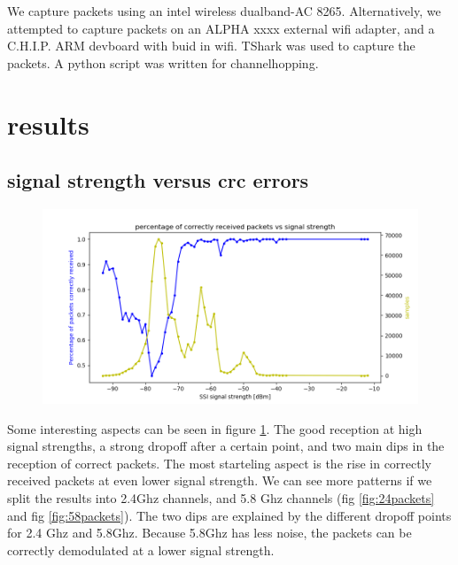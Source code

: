 \documentclass{article}
\begin{document}
We capture packets using an intel wireless dualband-AC 8265. Alternatively, we attempted to capture packets on an ALPHA xxxx external wifi adapter, and a C.H.I.P. ARM devboard with buid in wifi.
TShark was used to capture the packets. A python script was written for channelhopping.


\section{results}

\subsection{signal strength versus crc errors}

\begin{figure}
		\includegraphics[width=\textwidth]{figures/packets_total.png}
		\caption{}
		\label{fig:totalpackets}
\end{figure}

Some interesting aspects can be seen in figure \ref{fig:totalpackets}. The good reception at high signal strengths, a strong dropoff after a certain point, and two main dips in the reception of correct packets. The most starteling aspect is the rise in correctly received packets at even lower signal strength. We can see more patterns if we split the results into 2.4Ghz channels, and 5.8 Ghz channels (fig \ref{fig:24packets} and fig \ref{fig:58packets}). The two dips are explained by the different dropoff points for 2.4 Ghz and 5.8Ghz. Because 5.8Ghz has less noise, the packets can be correctly demodulated at a lower signal strength.
\end{document}

